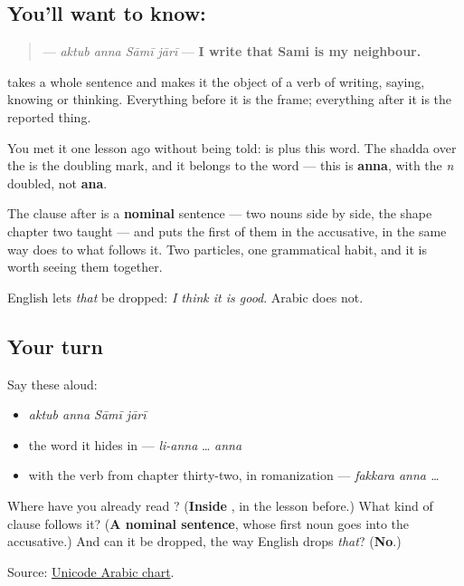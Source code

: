 \subsection*{You'll want to know: }
\begin{quote}
\textbf{   } — \emph{aktub anna Sāmī jārī} — \textbf{I write that Sami is my neighbour.}
\end{quote}

\textbf{} takes a whole sentence and makes it the object of a verb of writing, saying, knowing or thinking. Everything before it is the frame; everything after it is the reported thing.

You met it one lesson ago without being told: \textbf{} is \textbf{} plus this word. The shadda over the \textbf{} is the doubling mark, and it belongs to the word — this is \textbf{anna}, with the \emph{n} doubled, not \textbf{ana}.

\begin{grammarlens}[title={Grammar Lens: what follows it}]
The clause after \textbf{} is a \textbf{nominal} sentence — two nouns side by side, the shape chapter two taught — and \textbf{} puts the first of them in the accusative, in the same way \textbf{} does to what follows it. Two particles, one grammatical habit, and it is worth seeing them together.

English lets \emph{that} be dropped: \emph{I think it is good}. Arabic does not.
\end{grammarlens}

\subsection*{Your turn}
Say these aloud:

\begin{itemize}
\raggedright
  \item \emph{aktub anna Sāmī jārī}
  \item the word it hides in — \emph{li-anna} … \emph{anna}
  \item with the verb from chapter thirty-two, in romanization — \emph{fakkara anna …}
\end{itemize}

\begin{tcolorbox}[breakable,colback=teal!4,colframe=teal!35!black,title={Before you move on}]
Where have you already read \textbf{}? (\textbf{Inside }, in the lesson before.) What kind of clause follows it? (\textbf{A nominal sentence}, whose first noun goes into the accusative.) And can it be dropped, the way English drops \emph{that}? (\textbf{No}.)

Source: \href{https://www.unicode.org/charts/PDF/U0600.pdf}{Unicode Arabic chart}.
\end{tcolorbox}
